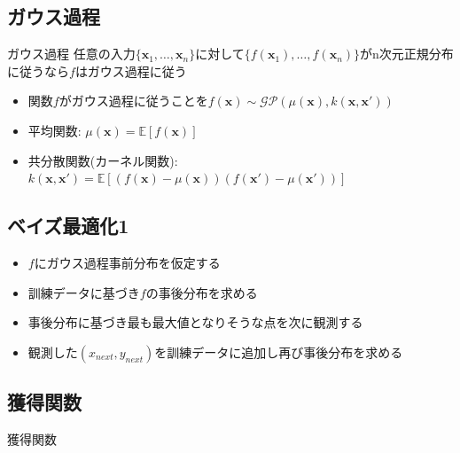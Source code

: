 \documentclass[dvipdfmx, 10.5pt]{beamer}
\begin{document}

\subsection{ガウス過程}
\begin{frame}{\insertsubsection}
	\begin{block}{ガウス過程}
		任意の入力$\{ \bm x_1, \ldots, \bm x_n \}$に対して$\{f(\bm x_1), \ldots, f(\bm x_n)\}$がn次元正規分布に従うなら$f$はガウス過程に従う
	\end{block}

\begin{itemize}
	\item 関数$f$がガウス過程に従うことを$f(\bm x) \sim \mathcal{GP}(\mu(\bm x), k(\bm x, \bm x'))$
	\item 平均関数: $\mu(\bm x) = \mathbb{E}[f(\bm x)]$
	\item 共分散関数(カーネル関数): $k(\bm x, \bm x') = \mathbb{E}[(f(\bm x) - \mu(\bm x))(f(\bm x') - \mu(\bm x'))]$
\end{itemize}
\end{frame}



\subsection{ベイズ最適化1}
\begin{frame}{\insertsubsection}
	\begin{itemize}
		\item $f$にガウス過程事前分布を仮定する
		\item 訓練データに基づき$f$の事後分布を求める
		\item 事後分布に基づき\alert{最も最大値となりそうな点}を次に観測する
		\item 観測した$(x_{next}, y_{next})$を訓練データに追加し再び事後分布を求める
	\end{itemize}

\end{frame}



\subsection{獲得関数}
\begin{frame}{\insertsubsection}
	\begin{block}{獲得関数}
		
	\end{block}

\end{frame}
\end{document}
